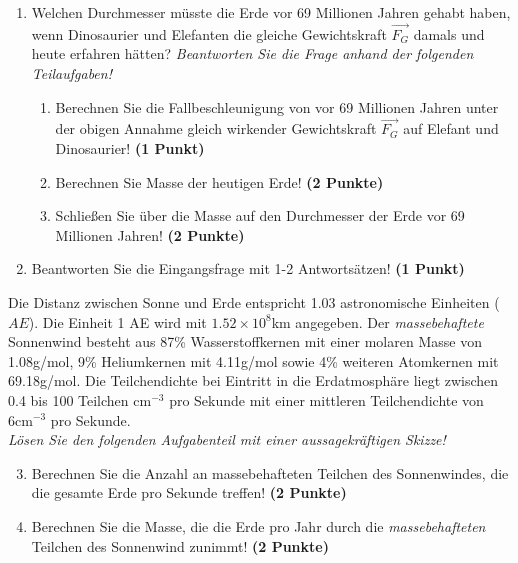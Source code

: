 \documentclass[a4paper, 9pt]{scrartcl}\usepackage[]{graphicx}\usepackage[]{xcolor}
\begin{document}
\begin{enumerate}
\item Welchen Durchmesser müsste die Erde vor 69 Millionen Jahren gehabt haben, wenn Dinosaurier und Elefanten die gleiche Gewichtskraft $\overrightarrow{F_G}$ damals und heute erfahren hätten? \textit{Beantworten Sie die Frage anhand der folgenden Teilaufgaben!}
\begin{enumerate}
\item Berechnen Sie die Fallbeschleunigung von vor 69 Millionen Jahren unter der obigen Annahme gleich wirkender Gewichtskraft $\overrightarrow{F_G}$ auf Elefant und Dinosaurier! \textbf{(1 Punkt)}
\item Berechnen Sie Masse der heutigen Erde! \textbf{(2 Punkte)}
\item Schließen Sie über die Masse auf den Durchmesser der Erde vor 69 Millionen Jahren! \textbf{(2 Punkte)}
\end{enumerate}
\item Beantworten Sie die Eingangsfrage mit 1-2 Antwortsätzen! \textbf{(1 Punkt)}
\end{enumerate}

Die Distanz zwischen Sonne und Erde entspricht 1.03 astronomische Einheiten ($AE$). Die Einheit 1 AE wird mit \ensuremath{1.52\times 10^{8}}km angegeben. Der \textit{massebehaftete} Sonnenwind besteht aus 87\% Wasserstoffkernen mit einer molaren Masse von 1.08g/mol, 9\% Heliumkernen mit 4.11g/mol sowie 4\% weiteren Atomkernen mit  69.18g/mol. Die Teilchendichte bei Eintritt in die Erdatmosphäre liegt zwischen 0.4 bis 100 Teilchen cm$^{-3}$ pro Sekunde mit einer mittleren Teilchendichte von 6cm$^{-3}$ pro Sekunde. \\

\textit{Lösen Sie den folgenden Aufgabenteil mit einer aussagekräftigen Skizze!}

\begin{enumerate}
  \setcounter{enumi}{2}
\item Berechnen Sie die Anzahl an massebehafteten Teilchen des Sonnenwindes, die die gesamte Erde pro Sekunde treffen! \textbf{(2 Punkte)}
\item Berechnen Sie die Masse, die die Erde pro Jahr durch die \textit{massebehafteten} Teilchen des Sonnenwind zunimmt! \textbf{(2 Punkte)}
\end{enumerate}
\end{document}
